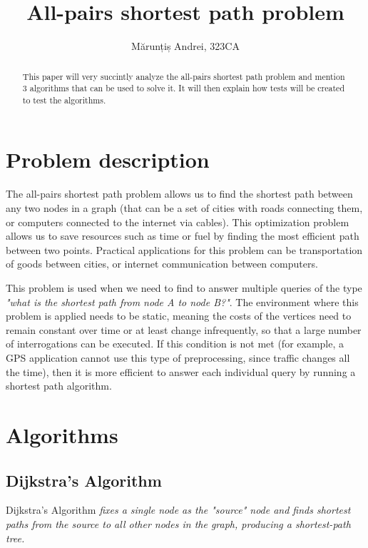 \documentclass[runningheads]{llncs}
\begin{document}
%
\title{All-pairs shortest path problem}
%
%
\author{Mărunțiș Andrei, 323CA}
%
\maketitle              %
%
\begin{abstract}
This paper will very succintly analyze the all-pairs shortest path problem and mention 3 algorithms that can be used to solve it. It will then explain how tests will be created to test the algorithms.

\end{abstract}
%
%
%
\section{Problem description}
The all-pairs shortest path problem allows us to find the shortest path between any two nodes in a graph (that can be a set of cities with roads connecting them, or computers connected to the internet via cables). This optimization problem allows us to save resources such as time or fuel by finding the most efficient path between two points. Practical applications for this problem can be transportation of goods between cities, or internet communication between computers.

This problem is used when we need to find to answer multiple queries of the type \textit{"what is the shortest path from node A to node B?"}. The environment where this problem is applied needs to be static, meaning the costs of the vertices need to remain constant over time or at least change infrequently, so that a large number of interrogations can be executed. If this condition is not met (for example, a GPS application cannot use this type of preprocessing, since traffic changes all the time), then it is more efficient to answer each individual query by running a shortest path algorithm.

\section{Algorithms}
\subsection{Dijkstra's Algorithm}
Dijkstra's Algorithm \textit{fixes a single node as the "source" node and finds shortest paths from the source to all other nodes in the graph, producing a shortest-path tree.}\cite{ref_url_Dj} 
\end{document}
